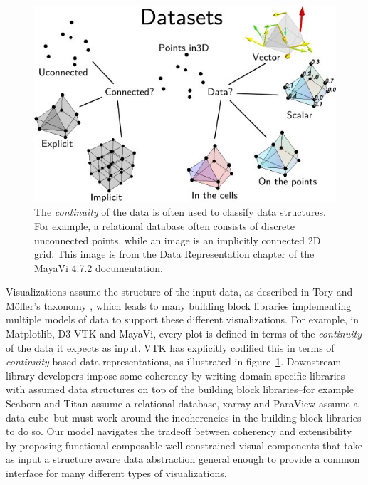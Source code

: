 \documentclass[../main.tex]{subfiles}
\begin{document}
\begin{figure}[H]
    \includegraphics[width=1\textwidth]{figures/intro/dataset_diagram.png}
    \caption{The \textit{continuity} of the data is often used to classify data structures. For example, a relational database often consists of discrete unconnected points, while an image is an implicitly connected 2D grid. This image is from the Data Representation chapter of the MayaVi 4.7.2 documentation.\cite{DataRepresentationMayavi}}
    \label{fig:intro:data:format}
\end{figure}

Visualizations assume the structure of the input data, as described in Tory and Möller's taxonomy \cite{toryRethinkingVisualizationHighlevel2004}, which leads to many building block libraries implementing multiple models of data to support these different visualizations. For example, in Matplotlib, D3\cite{bostockDataDrivenDocuments2011} VTK \cite{hanwellVisualizationToolkitVTK2015,geveciVTK2012} and MayaVi\cite{RamachandranMayaVI2011}, every plot is defined in terms of the \textit{continuity} of the data it expects as input. VTK has explicitly codified this in terms of \textit{continuity} based data representations, as illustrated in figure~\ref{fig:intro:data:format}. Downstream library developers impose some coherency by writing domain specific libraries with assumed data structures on top of the building block libraries--for example Seaborn\cite{waskom2020seaborn} and Titan\cite{brianwylieUnifiedToolkitInformation2009} assume a relational database, xarray\cite{hoyer2017xarray} and ParaView\cite{ahrens2005paraview} assume a data cube--but must work around the incoherencies in the building block libraries to do so. Our model navigates the tradeoff between coherency and extensibility by proposing functional composable well constrained visual components that take as input a structure aware data abstraction general enough to provide a common interface for many different types of visualizations. 
\end{document}
